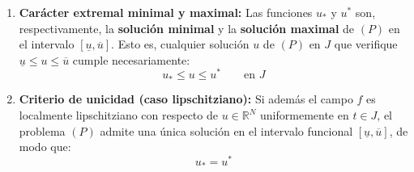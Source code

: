 \begin{teorema}
\begin{enumerate}
        \item \textbf{Carácter extremal minimal y maximal:} Las funciones $u_*$ y $u^*$ son, respectivamente, la \textbf{solución minimal} y la \textbf{solución maximal} de $(P)$ en el intervalo $[\underline{u}, \overline{u}]$. Esto es, cualquier solución $u$ de $(P)$ en $J$ que verifique $\underline{u} \leq u \leq \overline{u}$ cumple necesariamente:
        \[
            u_* \leq u \leq u^* \qquad \text{en } J
        \]
        \item \textbf{Criterio de unicidad (caso lipschitziano):} Si además el campo $f$ es localmente lipschitziano con respecto de $u \in \mathbb{R}^N$ uniformemente en $t \in J$, el problema $(P)$ admite una única solución en el intervalo funcional $[\underline{u}, \overline{u}]$, de modo que:
        \[
            u_* = u^*
        \]
    \end{enumerate}
\end{teorema}

